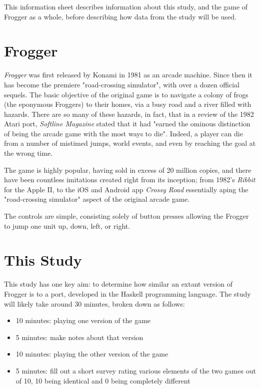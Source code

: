 \documentclass[12pt, a4paper]{report}
\begin{document}
\maketitle

This information sheet describes information about this study, and the game of Frogger as a whole, before describing how data from the study will be used.

\section{Frogger}
\textit{Frogger} was first released by Konami in 1981 as an arcade machine.
Since then it has become the premiere "road-crossing simulator", with over a dozen official sequels.
The basic objective of the original game is to navigate a colony of frogs (the eponymous Froggers) to their homes, via a busy road and a river filled with hazards.
There are so many of these hazards, in fact, that in a review of the 1982 Atari port, \textit{Softline Magazine} stated that it had "earned the ominous distinction of being the arcade game with the most ways to die". Indeed, a player can die from a number of mistimed jumps, world events, and even by reaching the goal at the wrong time.

\par

The game is highly popular, having sold in excess of 20 million copies, and there have been countless imitations created right from its inception; from 1982's \textit{Ribbit} for the Apple II, to the iOS and Android app \textit{Crossy Road} essentially aping the "road-crossing simulator" aspect of the original arcade game.

\par

The controls are simple, consisting solely of button presses allowing the Frogger to jump one unit up, down, left, or right.

\section{This Study}
This study has one key aim: to determine how similar an extant version of Frogger is to a port, developed in the Haskell programming language.
The study will likely take around 30 minutes, broken down as follows:
\begin{itemize}
  \item 10 minutes: playing one version of the game
  \item 5 minutes: make notes about that version
  \item 10 minutes: playing the other version of the game
  \item 5 minutes: fill out a short survey rating various elements of the two games out of 10, 10 being identical and 0 being completely different
\end{itemize}
\end{document}
